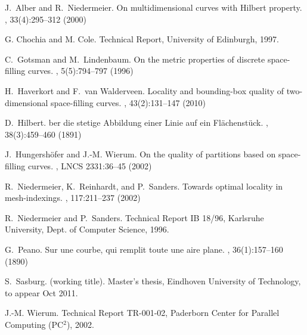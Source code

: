 \documentclass[11pt,a4paper]{article}
\begin{document}
\begin{thebibliography}{10}

J.~Alber and R.~Niedermeier.
\newblock On multidimensional curves with {H}ilbert property.
, 33(4):295--312 (2000)

G. Chochia and M. Cole.
\newblock Technical Report, University of Edinburgh, 1997.

C.~Gotsman and M.~Lindenbaum.
\newblock On the metric properties of discrete space-filling curves.
, 5(5):794--797 (1996)

H.~Haverkort and F.~van Walderveen.
\newblock Locality and bounding-box quality of two-dimensional space-filling curves.
, 43(2):131--147 (2010)

D.~Hilbert.
ber die stetige {A}bbildung einer {L}inie auf ein
  {F}l{\"a}chenst{\"u}ck.
, 38(3):459--460 (1891)

J.~Hungersh{\"o}fer and J.-M. Wierum.
\newblock On the quality of partitions based on space-filling curves.
, LNCS 2331:36--45 (2002)

R.~Niedermeier, K.~Reinhardt, and P.~Sanders.
\newblock Towards optimal locality in mesh-indexings.
, 117:211--237 (2002)

R.~Niedermeier and P.~Sanders.
\newblock Technical Report IB 18/96, Karlsruhe University, Dept. of Computer
  Science, 1996.

G.~Peano.
\newblock Sur une courbe, qui remplit toute une aire plane.
, 36(1):157--160 (1890)

S.~Sasburg.
 (working title).
\newblock Master's thesis, Eindhoven University of Technology, to appear Oct 2011.

J.-M. Wierum.
\newblock Technical Report TR-001-02, Paderborn Center for Parallel Computing
  (PC$^2$), 2002.

\end{thebibliography}
\end{document}
